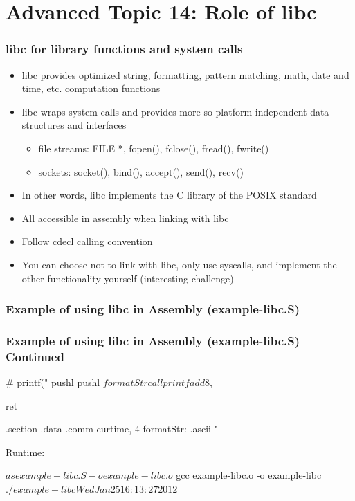 \documentclass[11pt,xcolor=dvipsnames]{beamer}
\newcommand{\vs}{\vspace{0.5em}}
\newcommand{\mvs}{\vspace{-0.95em}}
\begin{document}
\section{Advanced Topic 14: Role of libc}

\begin{frame}[fragile,t]
\frametitle{{\ttfamily libc} for library functions and system calls}
\begin{itemize}
  \item {\ttfamily libc} provides optimized string, formatting, pattern matching, math, date and time, etc. computation functions
  \item {\ttfamily libc} wraps system calls and provides more-so platform independent data structures and interfaces
  \begin{itemize}
    \item file streams: {\ttfamily FILE *, fopen(), fclose(), fread(), fwrite()}
    \item sockets: {\ttfamily socket(), bind(), accept(), send(), recv()}
  \end{itemize}
  \item In other words, {\ttfamily libc} implements the C library of the POSIX standard
  \vs
  \vs
  \pause
  \item All accessible in assembly when linking with {\ttfamily libc}
  \item Follow {\ttfamily cdecl} calling convention
  \item You can choose not to link with libc, only use syscalls, and implement the other functionality yourself (interesting challenge)
\end{itemize}
\end{frame}

\begin{frame}[fragile,t]
\mvs
\frametitle{Example of using libc in Assembly (example-libc.S)}
\end{frame}

\begin{frame}[fragile,t]
\mvs
\frametitle{Example of using libc in Assembly (example-libc.S) Continued}
\begin{gascode}
  # printf("%
  pushl %
  pushl $formatStr
  call printf
  add $8, %

  ret

.section .data
  .comm curtime, 4
  formatStr:  .ascii "%
\end{gascode}
{\small Runtime:}
\begin{textcode}
$ as example-libc.S -o example-libc.o
$ gcc example-libc.o -o example-libc
$ ./example-libc
Wed Jan 25 16:13:27 2012
$
\end{textcode}
\end{frame}
\end{document}
